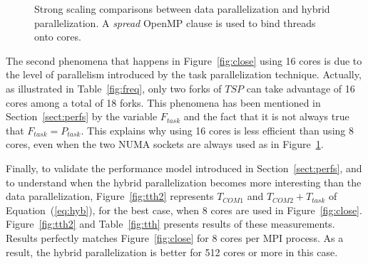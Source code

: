 \begin{figure}[!h]\begin{center}
  \caption{Strong scaling comparisons between data parallelization and hybrid parallelization. A \emph{spread} OpenMP clause is used to bind threads onto cores.}
  \label{fig:spread}
\end{center}\end{figure}

The second phenomena that happens in Figure~\ref{fig:close} using 16 cores is due to the level of parallelism introduced by the task parallelization technique. Actually, as illustrated in Table~\ref{fig:freq}, only two forks of $TSP$ can take advantage of 16 cores among a total of 18 forks. This phenomena has been mentioned in Section~\ref{sect:perfs} by the variable $F_{task}$ and the fact that it is not always true that $F_{task}=P_{task}$. This explains why using 16 cores is less efficient than using 8 cores, even when the two NUMA sockets are always used as in Figure~\ref{fig:spread}.

Finally, to validate the performance model introduced in Section~\ref{sect:perfs}, and to understand when the hybrid parallelization becomes more interesting than the data parallelization, Figure~\ref{fig:tth2} represents $T_{COM1}$ and $T_{COM2}+T_{task}$ of Equation~(\ref{eq:hyb}), for the best case, \ie when 8 cores are used in Figure~\ref{fig:close}.  Figure~\ref{fig:tth2} and Table~\ref{fig:tth} presents results of these measurements. Results perfectly matches Figure~\ref{fig:close} for 8 cores per MPI process. As a result, the hybrid parallelization is better for 512 cores or more in this case.

